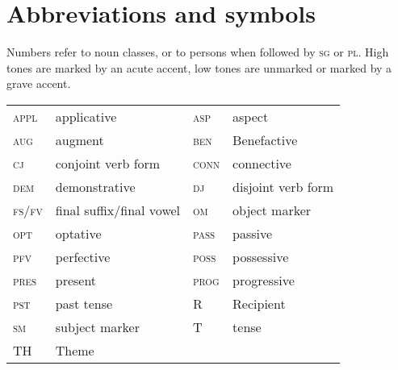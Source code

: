 \documentclass[output=paper
,modfonts
,nonflat]{langsci/langscibook}
\begin{document}
\section*{Abbreviations and symbols}
Numbers refer to noun classes, or to persons when followed by \textsc{sg} or \textsc{pl}. High tones are marked by an acute accent, low tones are unmarked or marked by a grave accent.
\begin{table}
	\begin{tabular}{llll} 	
		\textsc{appl} 	& applicative 					& \textsc{asp} 	& aspect \\ 	
		\textsc{aug} 	& augment 						& \textsc{ben} 	& Benefactive \\	
		\textsc{cj} 	& conjoint verb form 			& \textsc{conn} & connective \\	
		\textsc{dem}	& demonstrative 				& \textsc{dj} 	& disjoint verb form \\ 
		\textsc{fs/fv} 	& final suffix/final vowel 		& \textsc{om} 	& object marker \\	
		\textsc{opt}	& optative 						& \textsc{pass} & passive \\	
		\textsc{pfv} 	& perfective 					& \textsc{poss} & possessive \\	
		\textsc{pres} 	& present 						& \textsc{prog} & progressive \\	
		\textsc{pst} 	& past tense 					& R 			& Recipient \\	
		\textsc{sm} 	& subject marker 				& T 			& tense \\	
		TH 				& Theme 						&				&
	\end{tabular}		
\end{table}


\printbibliography[heading=subbibliography,notkeyword=this]
\end{document}
